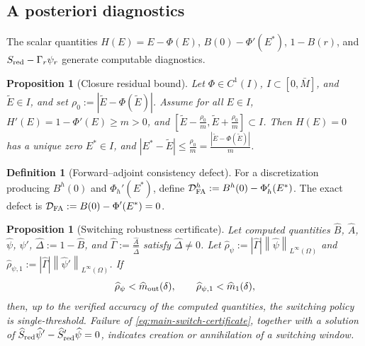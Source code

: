 \documentclass[pdflatex,sn-mathphys-num]{sn-jnl}
\theoremstyle{thmstyleone}
\newtheorem{proposition}[theorem]{Proposition}
\theoremstyle{definition}
\newtheorem{definition}[theorem]{Definition}
\theoremstyle{remark}
\newcommand{\Om}{\Omega}
\newcommand{\norm}[1]{\left\lVert#1\right\rVert}
\newcommand{\abs}[1]{\left\lvert#1\right\rvert}
\numberwithin{equation}{section}
\begin{document}
\subsection{A posteriori diagnostics}
\label{subsec:main-diagnostics}
The scalar quantities
$H(E)=E-\Phi(E)$,
$B(0)-\Phi'(E^*)$,
$1-B(r)$,
and
$S_{\rm red}-\Gamma_r\psi_r$
generate computable diagnostics.
\begin{proposition}[Closure residual bound]
\label{prop:main-closure-residual}
Let
$\Phi\in C^1(I)$,
$I\subset[0,\bar M]$,
and
$\tilde E\in I$,
and set
$\displaystyle 
\rho_0:=\abs{\tilde E-\Phi(\tilde E)}$.
Assume for all $E\in I$,
$H'(E)=1-\Phi'(E)\ge m>0$,
and
$\displaystyle 
\left[
\tilde E-\frac{\rho_0}{m},
\tilde E+\frac{\rho_0}{m}
\right]
\subset I$.
Then \(H(E)=0\) has a unique zero \(E^*\in I\), and
$\displaystyle 
\abs{E^*-\tilde E}
\le
\frac{\rho_0}{m}
=
\frac{\abs{\tilde E-\Phi(\tilde E)}}{m}$.
\end{proposition}
\begin{definition}[Forward--adjoint consistency defect]
\label{def:main-FA-defect}
For a discretization producing
$B^h(0)$ and
$\Phi_h'(E^*)$,
define
$\mathcal D_{\rm FA}^h
:=
B^h(0)-\Phi_h'(E^*)$.
The exact defect is
$\displaystyle 
\mathcal D_{\rm FA}
:=
B(0)-\Phi'(E^*)=0$.
\end{definition}
\begin{proposition}[Switching robustness certificate]
\label{prop:main-switching-certificate}
Let computed quantities
$\widehat B$, 
$\widehat A$, 
$\widehat\psi$, 
$\widehat\psi'$,
$\widehat\Delta:=1-\widehat B$,
and
$\displaystyle \widehat\Gamma:=\frac{\widehat A}{\widehat\Delta}$
satisfy
$\displaystyle 
\widehat\Delta\ne0$.
Let
$\widehat\rho_\psi:=
\abs{\widehat\Gamma}\norm{\widehat\psi}_{L^\infty(\Om)}$ and
$\widehat\rho_{\psi,1}:=
\abs{\widehat\Gamma}\norm{\widehat\psi'}_{L^\infty(\Om)}$.
If
\begin{equation}
\label{eq:main-switch-certificate}
\widehat\rho_\psi<\widehat m_{\rm out}(\delta),
\qquad
\widehat\rho_{\psi,1}<\widehat m_1(\delta),
\end{equation}
then, up to the verified accuracy of the computed quantities, the switching
policy is single-threshold. Failure of \eqref{eq:main-switch-certificate},
together with a solution of
$\displaystyle 
\widehat S_{\rm red}\widehat\psi'
-
\widehat S_{\rm red}'\widehat\psi
=0$,
indicates creation or annihilation of a switching window.
\end{proposition}
\end{document}
